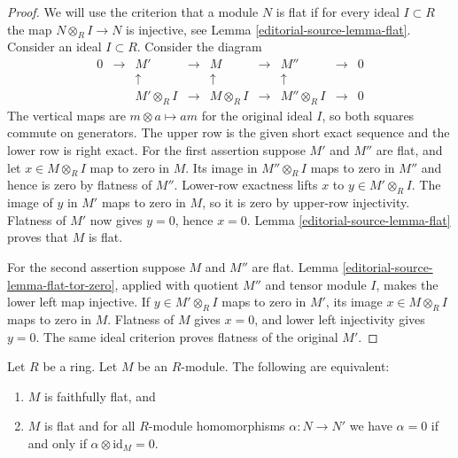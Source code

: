 \begin{proof}
We will use the criterion that a module $N$ is flat if for
every ideal $I \subset R$ the map $N \otimes_R I \to N$ is injective,
see Lemma \ref{editorial-source-lemma-flat}.
Consider an ideal $I \subset R$.
Consider the diagram
$$
\begin{matrix}
0 & \to & M' & \to & M & \to & M'' & \to & 0 \\
& & \uparrow & & \uparrow & & \uparrow & & \\
& & M'\otimes_R I & \to & M \otimes_R I & \to & M''\otimes_R I & \to & 0
\end{matrix}
$$
The vertical maps are $m\otimes a\mapsto am$ for the
original ideal $I$, so both squares commute on generators.
The upper row is the given short exact sequence and the
lower row is right exact. For the first assertion suppose
$M'$ and $M''$ are flat, and let $x\in M\otimes_R I$
map to zero in $M$. Its image in $M''\otimes_R I$ maps
to zero in $M''$ and hence is zero by flatness of $M''$.
Lower-row exactness lifts $x$ to $y\in M'\otimes_R I$.
The image of $y$ in $M'$ maps to zero in $M$, so it is
zero by upper-row injectivity. Flatness of $M'$ now gives
$y=0$, hence $x=0$. Lemma \ref{editorial-source-lemma-flat} proves that
$M$ is flat.

For the second assertion suppose $M$ and $M''$ are flat.
Lemma \ref{editorial-source-lemma-flat-tor-zero}, applied with quotient
$M''$ and tensor module $I$, makes the lower left map
injective. If $y\in M'\otimes_R I$ maps to zero in $M'$,
its image $x\in M\otimes_R I$ maps to zero in $M$.
Flatness of $M$ gives $x=0$, and lower left injectivity
gives $y=0$. The same ideal criterion proves flatness
of the original $M'$.
\end{proof}

\begin{lemma}
\label{editorial-source-lemma-easy-ff}
Let $R$ be a ring.
Let $M$ be an $R$-module.
The following are equivalent:
\begin{enumerate}
\item $M$ is faithfully flat, and
\item $M$ is flat and for all $R$-module homomorphisms $\alpha : N \to N'$
we have $\alpha = 0$ if and only if $\alpha \otimes \text{id}_M = 0$.
\end{enumerate}
\end{lemma}

